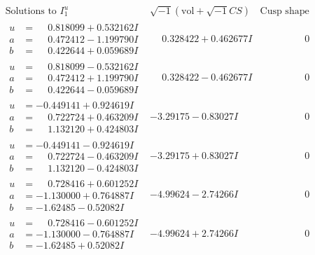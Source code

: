 \documentclass[1p]{elsarticle_modified}
\theoremstyle{definition}
\newcommand{\I}{\sqrt{-1}}
\begin{document}
$$\begin{array}{c|c|c}  
\text{Solutions to }I^u_{1}& \I (\text{vol} + \sqrt{-1}CS) & \text{Cusp shape}\\
 \hline 
\begin{aligned}
u &= \phantom{-}0.818099 + 0.532162 I \\
a &= \phantom{-}0.472412 - 1.199790 I \\
b &= \phantom{-}0.422644 + 0.059689 I\end{aligned}
 & \phantom{-}0.328422 + 0.462677 I & \phantom{-0.000000 } 0 \\ \hline\begin{aligned}
u &= \phantom{-}0.818099 - 0.532162 I \\
a &= \phantom{-}0.472412 + 1.199790 I \\
b &= \phantom{-}0.422644 - 0.059689 I\end{aligned}
 & \phantom{-}0.328422 - 0.462677 I & \phantom{-0.000000 } 0 \\ \hline\begin{aligned}
u &= -0.449141 + 0.924619 I \\
a &= \phantom{-}0.722724 + 0.463209 I \\
b &= \phantom{-}1.132120 + 0.424803 I\end{aligned}
 & -3.29175 - 0.83027 I & \phantom{-0.000000 } 0 \\ \hline\begin{aligned}
u &= -0.449141 - 0.924619 I \\
a &= \phantom{-}0.722724 - 0.463209 I \\
b &= \phantom{-}1.132120 - 0.424803 I\end{aligned}
 & -3.29175 + 0.83027 I & \phantom{-0.000000 } 0 \\ \hline\begin{aligned}
u &= \phantom{-}0.728416 + 0.601252 I \\
a &= -1.130000 + 0.764887 I \\
b &= -1.62485 - 0.52082 I\end{aligned}
 & -4.99624 - 2.74266 I & \phantom{-0.000000 } 0 \\ \hline\begin{aligned}
u &= \phantom{-}0.728416 - 0.601252 I \\
a &= -1.130000 - 0.764887 I \\
b &= -1.62485 + 0.52082 I\end{aligned}
 & -4.99624 + 2.74266 I & \phantom{-0.000000 } 0 \\ \hline\begin{aligned}

\end{aligned}
\end{array}$$
\end{document}

